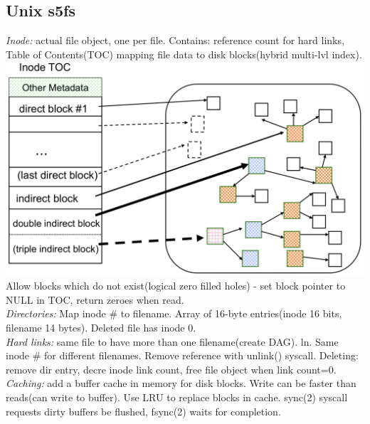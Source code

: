 \subsection*{Unix s5fs}
\emph{Inode:} actual file object, one per file. Contains: reference count for hard links, Table of Contents(TOC) mapping file data to disk blocks(hybrid multi-lvl index).\\
\includegraphics[width=0.9\linewidth]{images/s5fs-toc}\\
Allow blocks which do not exist(logical zero filled holes) - set block pointer to NULL in TOC, return zeroes when read.\\
\emph{Directories:} Map inode \# to filename. Array of 16-byte entries(inode 16 bits, filename 14 bytes). Deleted file has inode 0.\\
\emph{Hard links:} same file to have more than one filename(create DAG). ln. Same inode \# for different filenames. Remove reference with unlink() syscall. Deleting: remove dir entry, decre inode link count, free file object when link count=0.\\
\emph{Caching:} add a buffer cache in memory for disk blocks. Write can be faster than reads(can write to buffer). Use LRU to replace blocks in cache. sync(2) syscall requests dirty buffers be flushed, fsync(2) waits for completion.